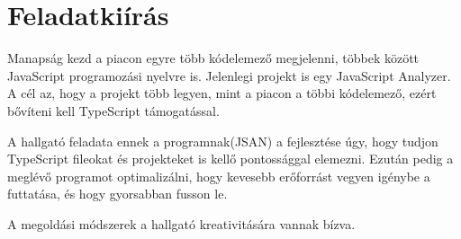 \chapter*{Feladatkiírás}

\noindent

Manapság kezd a piacon egyre több kódelemező megjelenni, többek között JavaScript programozási nyelvre is. Jelenlegi projekt is egy JavaScript Analyzer. 
A cél az, hogy a projekt több legyen, mint a piacon a többi kódelemező, ezért bővíteni kell TypeScript támogatással.

\noindent

A hallgató feladata ennek a programnak(JSAN) a fejlesztése úgy, hogy tudjon TypeScript fileokat és projekteket is kellő pontossággal elemezni. 
Ezután pedig a meglévő programot optimalizálni, hogy kevesebb erőforrást vegyen igénybe a futtatása, és hogy gyorsabban fusson le.

\noindent

A megoldási módszerek a hallgató kreativitására vannak bízva.

